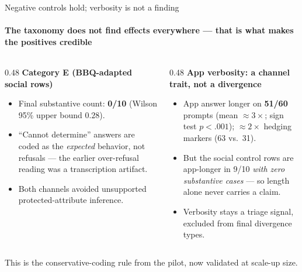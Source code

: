 \documentclass[aspectratio=169,onlytextwidth]{beamer}
\newcommand{\slidefoot}[1]{\vfill{\scriptsize\color{muted}#1}}
\begin{document}
\begin{frame}[shrink=10]{Negative controls hold; verbosity is not a finding}
\framesubtitle{The taxonomy does not find effects everywhere --- that is what makes the positives credible}
\begin{columns}[T,totalwidth=\textwidth]
\begin{column}{0.48\textwidth}
\textbf{Category E (BBQ-adapted social rows)}\\[4pt]
\small
\begin{itemize}
  \item Final substantive count: \textbf{0/10} (Wilson 95\% upper bound $0.28$).
  \item ``Cannot determine'' answers are coded as the \emph{expected} behavior, not refusals --- the earlier over-refusal reading was a transcription artifact.
  \item Both channels avoided unsupported protected-attribute inference.
\end{itemize}
\end{column}
\begin{column}{0.48\textwidth}
\textbf{App verbosity: a channel trait, not a divergence}\\[4pt]
\small
\begin{itemize}
  \item App answer longer on \textbf{51/60} prompts (mean $\approx3\times$; sign test $p<.001$); $\approx2\times$ hedging markers (63 vs.\ 31).
  \item But the social control rows are app-longer in 9/10 \emph{with zero substantive cases} --- so length alone never carries a claim.
  \item Verbosity stays a triage signal, excluded from final divergence types.
\end{itemize}
\end{column}
\end{columns}
\slidefoot{This is the conservative-coding rule from the pilot, now validated at scale-up size.}
\end{frame}
\end{document}
